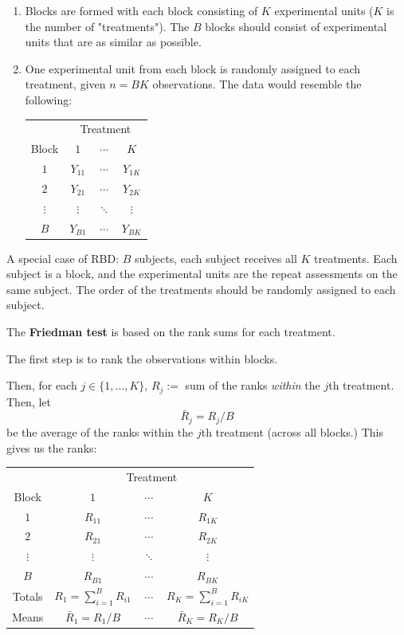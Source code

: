 \documentclass[12pt]{article}
\begin{document}
\begin{enumerate}
    \item Blocks are formed with each block consisting of $K$ experimental units ($K$ is the number of "treatments"). The $B$ blocks should consist of experimental units that are as similar as possible.
    \item One experimental unit from each block is randomly assigned to each treatment, given $n = BK$ observations. The data would resemble the following:
    \begin{center}
        \begin{tabular}{c c c c}
            & \multicolumn{3}{c}{Treatment}\\
            \cline{2-4}
            Block & $1$ & $\cdots$ & $K$ \\
            \hline
            $1$ & $Y_{11}$ & $\cdots$ & $Y_{1K}$ \\
            $2$ & $Y_{21}$ & $\cdots$ & $Y_{2K}$ \\
            $\vdots$ & $\vdots$ & $\ddots$ & $\vdots$ \\
            $B$ & $Y_{B1}$ & $\cdots$ & $Y_{BK}$ \\
            \hline
        \end{tabular}
    \end{center}
\end{enumerate}

A special case of RBD: $B$ subjects, each subject receives all $K$ treatments. Each subject is a block, and the experimental units are the repeat assessments on the same subject. The order of the treatments should be randomly assigned to each subject.

The \textbf{Friedman test} is based on the rank sums for each treatment. 

The first step is to rank the observations within blocks.

Then, for each $j \in \{1, \dots, K\}$, $R_j :=$ sum of the ranks \textit{within} the $j$th treatment. Then, let \[\bar{R}_j = R_j / B\] be the average of the ranks within the $j$th treatment (across all blocks.) This gives us the ranks:

\begin{center}
    \begin{tabular}{c c c c}
        & \multicolumn{3}{c}{Treatment}\\
        \cline{2-4}
        Block & $1$ & $\cdots$ & $K$ \\
        \hline
        $1$ & $R_{11}$ & $\cdots$ & $R_{1K}$ \\
        $2$ & $R_{21}$ & $\cdots$ & $R_{2K}$ \\
        $\vdots$ & $\vdots$ & $\ddots$ & $\vdots$ \\
        $B$ & $R_{B1}$ & $\cdots$ & $R_{BK}$ \\
        \hline
        Totals & $R_1 = \sum_{i=1}^B R_{i1}$ & $\cdots$ & $R_K = \sum_{i=1}^B R_{iK}$ \\
        Means & $\bar{R}_1 = R_1 / B$ & $\cdots$ & $\bar{R}_K = R_K / B$ \\
    \end{tabular}
\end{center}
\end{document}
